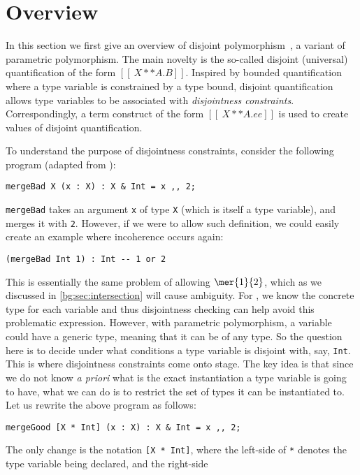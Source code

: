 
\section{Overview}

In this section we first give an overview of
disjoint polymorphism~\citep{alpuimdisjoint}, a variant of parametric polymorphism. The main novelty
is the so-called disjoint (universal) quantification of the form
$[[ \ X ** A . B ]]$. Inspired by bounded quantification~\citep{cardelli1994extension} where a
type variable is constrained by a type bound, disjoint quantification allows
type variables to be associated with \textit{disjointness constraints}. Correspondingly, a
term construct of the form $[[ \ X ** A. ee ]]$ is used to create values of
disjoint quantification.

To understand the purpose of disjointness constraints, consider the following program (adapted from \citet{alpuimdisjoint}):
\begin{lstlisting}
mergeBad X (x : X) : X & Int = x ,, 2;
\end{lstlisting}
\lstinline{mergeBad} takes an argument \lstinline{x} of type \lstinline{X} (which is itself a type variable), and merges it with \lstinline{2}.
However, if we were to allow such definition, we could easily create an example where incoherence occurs again:
\begin{lstlisting}
(mergeBad Int 1) : Int -- 1 or 2
\end{lstlisting}
This is essentially the same problem of allowing $\mer{1}{2}$, which as we
discussed in \cref{bg:sec:intersection} will cause ambiguity. For \namee, we
know the concrete type for each variable and thus disjointness checking can help
avoid this problematic expression. However, with parametric polymorphism, a variable
could have a generic type, meaning that it can be of any type. So the question here
is to decide under what conditions a type variable is disjoint with, say,
\lstinline{Int}. This is where disjointness constraints come onto stage. The key idea
is that since we do not know \textit{a priori} what is the exact instantiation a
type variable is going to have, what we can do is to restrict the set of types
it can be instantiated to. Let us rewrite the above program as follows:
\begin{lstlisting}
mergeGood [X * Int] (x : X) : X & Int = x ,, 2;
\end{lstlisting}
The only change is the notation \lstinline{[X * Int]}, where the left-side of
\lstinline{*} denotes the type variable being declared, and the right-side

